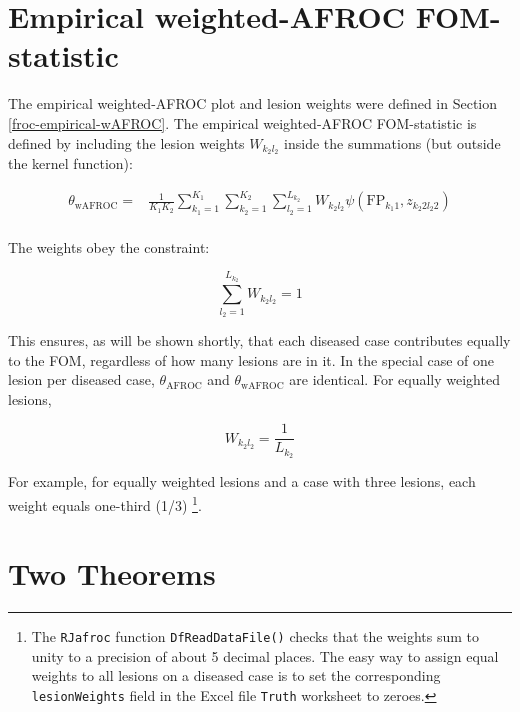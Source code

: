 \documentclass[
]{book}
\begin{document}
\hypertarget{froc-meanings-wafroc}{%
\section{Empirical weighted-AFROC FOM-statistic}\label{froc-meanings-wafroc}}

The empirical weighted-AFROC plot and lesion weights were defined in Section \ref{froc-empirical-wAFROC}. The empirical weighted-AFROC FOM-statistic \citep{RN1385} is defined by including the lesion weights \(W_{k_2 l_2}\) inside the summations (but outside the kernel function):

\begin{equation}
\begin{aligned} 
\theta_{\text{wAFROC}} =& \frac{1}{K_1 K_2}\sum_{k_1=1}^{K_1}\sum_{k_2=1}^{K_2}\sum_{l_2=1}^{L_{k_2}}W_{k_2 l_2}\psi\left ( \text{FP}_{k_1 1}, z_{k_2 2 l_2 2} \right )\\
\end {aligned}
\label{eq:froc-meanings-theta-wafroc}
\end{equation}

The weights obey the constraint:

\begin{equation} 
\sum_{l_2=1}^{L_{k_2}}W_{k_2 l_2} = 1
\label{eq:froc-meanings-theta-constraint-weights}
\end{equation}

This ensures, as will be shown shortly, that each diseased case contributes equally to the FOM, regardless of how many lesions are in it. In the special case of one lesion per diseased case, \(\theta_{\text{AFROC}}\) and \(\theta_{\text{wAFROC}}\) are identical. For equally weighted lesions,

\begin{equation} 
W_{k_2 l_2} = \frac{1}{L_{k_2}}
\label{eq:froc-meanings-theta-equal-weights}
\end{equation}

For example, for equally weighted lesions and a case with three lesions, each weight equals one-third (1/3) \footnote{The \texttt{RJafroc} function \texttt{DfReadDataFile()} checks that the weights sum to unity to a precision of about 5 decimal places. The easy way to assign equal weights to all lesions on a diseased case is to set the corresponding \texttt{lesionWeights} field in the Excel file \texttt{Truth} worksheet to zeroes.}.

\hypertarget{froc-meanings-two-theorems}{%
\section{Two Theorems}\label{froc-meanings-two-theorems}}
\end{document}
